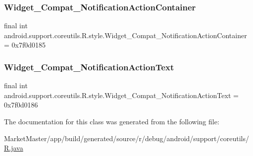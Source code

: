 \subsubsection{\texorpdfstring{Widget\+\_\+\+Compat\+\_\+\+Notification\+Action\+Container}{Widget\_Compat\_NotificationActionContainer}}
{\footnotesize\ttfamily final int android.\+support.\+coreutils.\+R.\+style.\+Widget\+\_\+\+Compat\+\_\+\+Notification\+Action\+Container = 0x7f0d0185\hspace{0.3cm}{\ttfamily [static]}}

\mbox{\label{classandroid_1_1support_1_1coreutils_1_1R_1_1style_afecf35538e16fa5d87a95f377bcd856d}} 
\subsubsection{\texorpdfstring{Widget\+\_\+\+Compat\+\_\+\+Notification\+Action\+Text}{Widget\_Compat\_NotificationActionText}}
{\footnotesize\ttfamily final int android.\+support.\+coreutils.\+R.\+style.\+Widget\+\_\+\+Compat\+\_\+\+Notification\+Action\+Text = 0x7f0d0186\hspace{0.3cm}{\ttfamily [static]}}



The documentation for this class was generated from the following file\+:\begin{DoxyCompactItemize}
\item 
Market\+Master/app/build/generated/source/r/debug/android/support/coreutils/\mbox{\hyperlink{debug_2android_2support_2coreutils_2R_8java}{R.\+java}}\end{DoxyCompactItemize}
